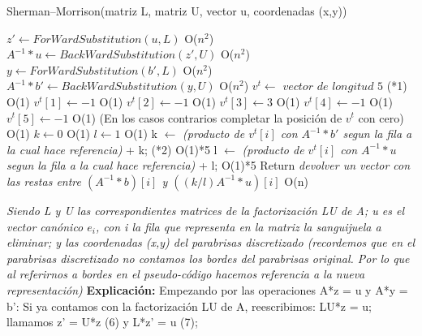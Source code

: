 \documentclass[a4paper]{article}
\begin{document}
 \begin{algorithm}[H]
\caption{Sherman–Morrison(matriz L, matriz U, vector u, coordenadas (x,y))}
\begin{algorithmic}[1]

\State $ z' \gets ForWardSubstitution(u, L)$ O($n^2$)
\State $ A^{-1}*u \gets BackWardSubstitution(z', U)$ O($n^2$)
\State $ y \gets ForWardSubstitution(b', L)$ O($n^2$)
\State $ A^{-1}*b' \gets BackWardSubstitution(y, U)$ O($n^2$)
\State $ v^t \gets$ $vector$ $de$ $longitud$ $5$ (*1) O(1)
        		\State $ v^t[1] \gets -1  $	O(1)	
	\EndIf
        		\State $ v^t[2] \gets -1  $ 	O(1)	
	\EndIf
			\State $ v^t[3] \gets 3  $ O(1)
        		\State $ v^t[4] \gets -1  $ 	O(1)	
	\EndIf
        		\State $ v^t[5] \gets -1  $ 	O(1)	
	\EndIf
	(En los casos contrarios completar la posición de $v^t$ con cero) O(1)
	 \State $ k \gets 0  $ 	O(1)
	 \State $ l \gets 1  $   O(1)
        		\State k $\gets$ \textit{(producto de $v^t[i]$ con $ A^{-1}*b'$ segun la fila a la cual hace referencia)} + k;	(*2)	 O(1)*5
        		\State l $\gets$ \textit{(producto de $v^t[i]$ con $A^{-1}*u$ segun la fila a la cual hace referencia)} + l; O(1)*5
	\EndIf
\EndFor
\State  Return \textit{devolver un vector con las restas entre  $(A^{-1}*b)[i]$ y  $((k/l)A^{-1}*u)[i]$}    O(n)

\end{algorithmic}
\end{algorithm}
\textit{Siendo L y U las correspondientes matrices de la factorizaci\'on LU de A; u es el vector can\'onico $e_i$, con i la fila que representa en la matriz la sanguijuela a eliminar; y las coordenadas (x,y) del parabrisas discretizado (recordemos que en el parabrisas discretizado no contamos los bordes del parabrisas original. Por lo que al referirnos a bordes en el pseudo-c\'odigo hacemos referencia a la nueva representaci\'on)}\newline\newline
 \textbf{Explicación:}\newline  
Empezando por las operaciones A*z = u y A*y = b': \newline
Si ya contamos con la factorización LU de A, reescribimos:\newline
LU*z = u; \newline
llamamos z' = U*z (6) y L*z' = u (7);\newline
\end{document}
